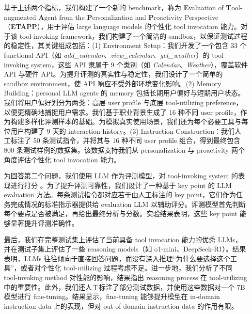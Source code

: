 \documentclass[11pt]{article}
\begin{document}
基于上述两个指标，我们构建了一个新的 benchmark，称为 \textbf{E}valuation of \textbf{T}ool-augmented \textbf{A}gent from the \textbf{P}ersonalization and \textbf{P}roactivity Perspective（\textbf{ETAPP}），用于评估 large language models 的个性化 tool invocation 能力。对于该 tool-invoking framework，我们构建了一个简洁的 sandbox，以保证测试过程的稳定性，其关键组成包括：(1) Environment Setup：我们开发了一个包含 33 个 functional API（如 \textit{add\_calendar}、\textit{view\_calendar}、\textit{get\_weather}）的 tool-invoking system，这些 API 隶属于 9 个类别（如 \textit{Calendar}、\textit{Weather}），覆盖软件 API 与硬件 API。为提升评测的真实性与稳定性，我们设计了一个简单的 sandbox environment，使 API 响应不受外部环境变化影响。(2) Memory Building：personal LLM agents 的 memory 包括长期用户偏好与短期用户状态。我们将用户偏好划分为两类：高层 user profile 与底层 tool-utilizing preference，以便更精确地捕捉用户需求。我们基于职业背景生成了 16 种不同 user profile，作为构建多样化评测样本的基础。为模拟真实使用场景，我们还为每个必要工具与每位用户构建了 9 天的 interaction history。(3) Instruction Construction：我们人工标注了 50 条测试指令，并将其与 16 种不同 user profile 组合，得到最终包含 800 条测试样例的数据集。该数据支持我们从 personalization 与 proactivity 两个角度评估个性化 tool invocation 能力。




为回答第二个问题，我们使用 LLM 作为评测模型，对 tool-invoking system 的表现进行打分 \cite{li2025generationjudgmentopportunitieschallenges, li2024llmsasjudgescomprehensivesurveyllmbased}。为了提升评测可靠性，我们设计了一种基于 key point 的 LLM evaluation 方法。每条测试指令都对应若干由人工标注的 key point，它们作为任务完成情况的标准指示器提供给 evaluation LLM 以辅助评分。评测模型首先判断每个要点是否被满足，再给出最终分析与分数。实验结果表明，这些 key point 能够显著提升评测准确性。






最后，我们在完整测试集上评估了当前具备 tool invocation 能力的优秀 LLMs，并在测试子集上评估了一些 reasoning models（如 o1-mini、DeepSeek-R1）。结果表明，LLMs 往往倾向于直接回答问题，而没有深入推理“为什么要选择这个工具”，或者对个性化 tool-utilizing 过程考虑不足。进一步地，我们分析了不同 tool-invoking method 对性能的影响，结果指出 reasoning process 在 tool-utilizing 中的重要性。此外，我们还人工标注了部分测试数据，并使用这些数据对一个 7B 模型进行 fine-tuning。结果显示，fine-tuning 能够提升模型在 in-domain instruction data 上的表现，但对 out-of-domain instruction data 的作用有限。
\end{document}
